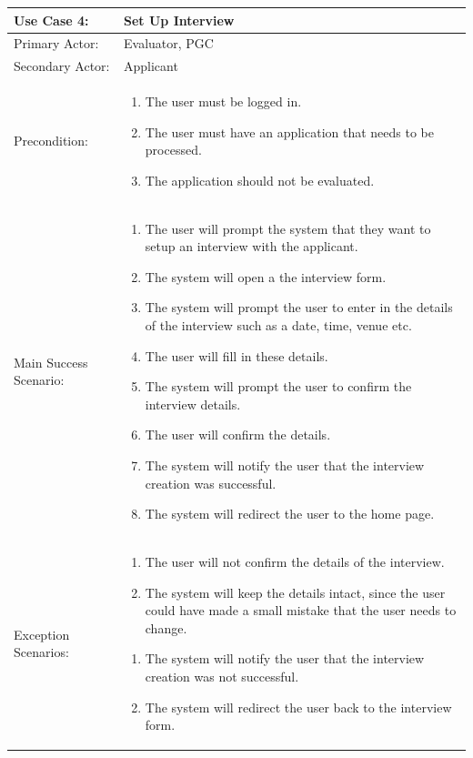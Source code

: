 \documentclass{article}
\begin{document}
\begin{tabular} {| m{5cm} | m{10cm} |}
\hline
Use Case 4: & Set Up Interview \\
\hline
Primary Actor: & Evaluator, PGC \\
\hline
Secondary Actor: & Applicant \\
\hline
Precondition: & \begin{enumerate} \itemsep0em \item The user must be logged in.
\item The user must have an application that needs to be processed.
\item The application should not be evaluated.
\end{enumerate} \\
\hline
Main Success Scenario: & \begin{enumerate} \itemsep0em \item The user will prompt the system that they want to setup an interview with the applicant.
\item The system will open a the interview form.
\item The system will prompt the user to enter in the details of the interview such as a date, time, venue etc.
\item The user will fill in these details.
\item The system will prompt the user to confirm the interview details.
\item The user will confirm the details.
\item The system will notify the user that the interview creation was successful.
\item The system will redirect the user to the home page.
\end{enumerate} \\
\hline
Exception Scenarios: & \begin{enumerate} \itemsep0em \item The user will not confirm the details of the interview.
\item The system will keep the details intact, since the user could have made a small mistake that the user needs to change.
\end{enumerate} \begin{enumerate} \itemsep0em \item  The system will notify the user that the interview creation was not successful.
\item The system will redirect the user back to the interview form.
\end{enumerate}\\
\hline
\end{tabular}
\end{document}
